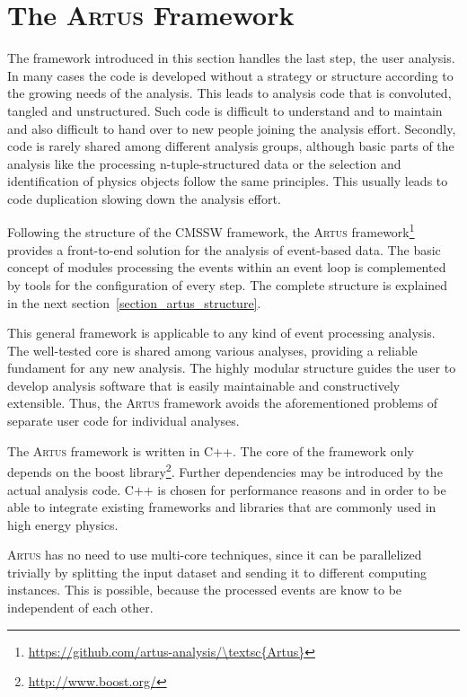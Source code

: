 \documentclass[3p]{elsarticle}
\newcommand{\software}[1]{\textsc{#1}\xspace}
\newcommand{\artus}{\software{Artus}}
\begin{document}
\section{The \artus Framework \label{section_artus_motivation}}

The framework introduced in this section handles the last step, the user analysis. In many cases the code is developed without a strategy or structure according to the growing needs of the analysis. This leads to analysis code that is convoluted, tangled and unstructured. Such code is difficult to understand and to maintain and also difficult to hand over to new people joining the analysis effort. Secondly, code is rarely shared among different analysis groups, although basic parts of the analysis like the processing n-tuple-structured data or the selection and identification of physics objects follow the same principles. This usually leads to code duplication slowing down the analysis effort.

Following the structure of the CMSSW  framework, the \artus framework\footnote{\url{https://github.com/artus-analysis/\artus}} provides a front-to-end solution for the analysis of event-based data. The basic concept of modules processing the events within an event loop is complemented by tools for the configuration of every step. The complete structure is explained in the next section~\ref{section_artus_structure}.

This general framework is applicable to any kind of event processing analysis. The well-tested core is shared among various analyses, providing a reliable fundament for any new analysis. The highly modular structure guides the user to develop analysis software that is easily maintainable and constructively extensible. Thus, the \artus framework avoids the aforementioned problems of separate user code for individual analyses.

The \artus framework is written in C++. The core of the framework only depends on the boost library\footnote{\url{http://www.boost.org/}}. Further dependencies may be introduced by the actual analysis code. C++ is chosen for performance reasons and in order to be able to integrate existing frameworks and libraries that are commonly used in high energy physics.

\artus has no need to use multi-core techniques, since it can be parallelized trivially by splitting the input dataset and sending it to different computing instances. This is possible, because the processed events are know to be independent of each other.
\end{document}
